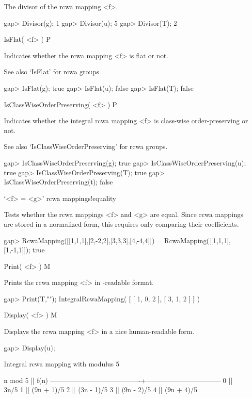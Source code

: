The divisor of the rcwa mapping <f>.

\beginexample
gap> Divisor(g);
1
gap> Divisor(u);
5
gap> Divisor(T);
2
\endexample

\>IsFlat( <f> ) P

Indicates whether the rcwa mapping <f> is flat or not.

See also `IsFlat' for rcwa groups.

\beginexample
gap> IsFlat(g);
true
gap> IsFlat(u);
false
gap> IsFlat(T);
false
\endexample

\>IsClassWiseOrderPreserving( <f> ) P

Indicates whether the integral rcwa mapping <f> is class-wise
order-preserving or not.

See also `IsClassWiseOrderPreserving' for rcwa groups.

\beginexample
gap> IsClassWiseOrderPreserving(g);
true
gap> IsClassWiseOrderPreserving(u);
true
gap> IsClassWiseOrderPreserving(T);
true
gap> IsClassWiseOrderPreserving(t);
false
\endexample


\>`<f> = <g>' {rcwa mappings!equality}

Tests whether the rcwa mappings <f> and <g> are equal.
Since rcwa mappings are stored in a normalized form, this requires
only comparing their coefficients.

\beginexample
gap> RcwaMapping([[1,1,1],[2,-2,2],[3,3,3],[4,-4,4]]) = RcwaMapping([[1,1,1],[1,-1,1]]);
true
\endexample


\>Print( <f> ) M

Prints the rcwa mapping <f> in {\GAP}-readable format.

\beginexample
gap> Print(T,"\n");
IntegralRcwaMapping( [ [ 1, 0, 2 ], [ 3, 1, 2 ] ] )
\endexample

\>Display( <f> ) M

Displays the rcwa mapping <f> in a nice human-readable form.

\beginexample
gap> Display(u);

Integral rcwa mapping with modulus 5

               n mod 5                  ||              f(n)              
----------------------------------------+---------------------------------
  0                                     || 3n/5
  1                                     || (9n + 1)/5
  2                                     || (3n - 1)/5
  3                                     || (9n - 2)/5
  4                                     || (9n + 4)/5

